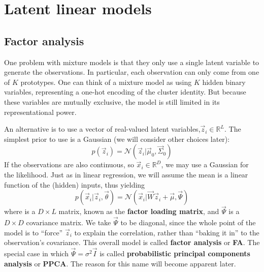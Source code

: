 \chapter{Latent linear models}


\section{Factor analysis}
One problem with mixture models is that they only use a single latent variable to generate the observations. In particular, each observation can only come from one of $K$ prototypes. One can think of a mixture model as using $K$ hidden binary variables, representing a one-hot encoding of the cluster identity. But because these variables are mutually exclusive, the model is still limited in its representational power.

An alternative is to use a vector of real-valued latent variables,$\vec{z}_i \in \mathbb{R}^L$. The simplest prior to use is a Gaussian (we will consider other choices later):
\begin{equation}\label{eqn:FA-prior}
p(\vec{z}_i)=\mathcal{N}(\vec{z}_i|\vec{\mu}_0,\vec{\Sigma}_0)
\end{equation}
If the observations are also continuous, so $\vec{x}_i \in \mathbb{R}^D$, we may use a Gaussian for the likelihood. Just as in linear regression, we will assume the mean is a linear function of the (hidden) inputs, thus yielding
\begin{equation}\label{eqn:FA-class-conditional-density}
p(\vec{x}_i|\vec{z}_i,\vec{\theta})=\mathcal{N}(\vec{x}_i|\vec{W}\vec{z}_i+\vec{\mu},\vec{\Psi})
\end{equation}
where  is a $D \times L$ matrix, known as the \textbf{factor loading matrix}, and $\vec{\Psi}$ is a $D \times D$ covariance matrix. We take $\vec{\Psi}$ to be diagonal, since the whole point of the model is to “force” $\vec{z}_i$ to explain the correlation, rather than “baking it in” to the observation’s covariance. This overall model is called \textbf{factor analysis} or \textbf{FA}. The special case in which $\vec{\Psi}=\sigma^2\vec{I}$ is called \textbf{probabilistic principal components analysis} or \textbf{PPCA}. The reason for this name will become apparent later.


